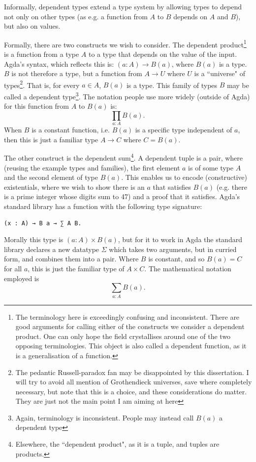 \documentclass[12pt,a4paper,twoside,openright]{report}
\begin{document}
Informally, dependent types extend a type system by allowing types to depend not only on other types (as e.g. a function from $A$ to $B$ depends on $A$ and $B$), but also on values. 

Formally, there are two constructs we wish to consider. The dependent product\footnote{The terminology here is exceedingly confusing and inconsistent. There are good arguments for calling either of the constructs we consider a dependent product. One can only hope the field crystallises around one of the two opposing terminologies. This object is also called a dependent function, as it is a generalisation of a function.} is a function from a type $A$ to a type that depends on the value of the input. Agda's syntax, which reflects this is: $(a : A) \to B(a)$, where $B(a)$ is a type. $B$ is not therefore a type, but a function from $A \to U$ where $U$ is a ``universe" of types\footnote{The pedantic Russell-paradox fan may be disappointed by this dissertation. I will try to avoid all mention of Grothendieck universes, save where completely necessary, but note that this is a choice, and these considerations do matter. They are just not the main point I am aiming at here}. That is, for every $a \in A$, $B(a)$ is a type. This family of types $B$ may be called a dependent type\footnote{Again, terminology is inconsistent. People may instead call $B(a)$ a dependent type}. The notation people use more widely (outside of Agda) for this function from $A$ to $B(a)$ is:
\[
\prod_{a: A} B(a).
\]
When $B$ is a constant function, i.e. $B(a)$ is a specific type independent of $a$, then this is just a familiar type $A \to C$ where $C = B(a)$.

The other construct is the dependent sum\footnote{Elsewhere, the ``dependent product", as it is a tuple, and tuples are products.}. A dependent tuple is a pair, where (reusing the example types and families), the first element $a$ is of some type $A$ and the second element of type $B(a)$. This enables us to encode (constructive) existentials, where  we wish to show there is an $a$ that satisfies $B(a)$ (e.g. there is a prime integer whose digits sum to 47) and a proof that it satisfies. Agda's standard library has a function with the following type signature:
\begin{verbatim}
(x : A) → B a → ∑ A B.
\end{verbatim} 
Morally this type is $(a : A) \times B(a)$, but for it to work in Agda the standard library declares a new datatype $\Sigma$ which takes two arguments, but in curried form, and combines them into a pair. Where $B$ is constant, and so $B(a) = C$ for all $a$, this is just the familiar type of $A \times C$. The mathematical notation employed is
\[
\sum_{a : A} B(a). 
\]
\end{document}

